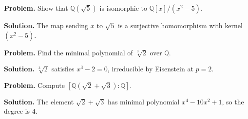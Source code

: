 \begin{example}\label{ex:sec2-8}
\textbf{Problem.} Show that $\mathbb{Q}(\sqrt{5})$ is isomorphic to $\mathbb{Q}[x]/(x^2-5)$.

\textbf{Solution.} The map sending $x$ to $\sqrt{5}$ is a surjective homomorphism with kernel $(x^2-5)$.
\end{example}

\begin{example}\label{ex:sec2-9}
\textbf{Problem.} Find the minimal polynomial of $\sqrt[3]{2}$ over $\mathbb{Q}$.

\textbf{Solution.} $\sqrt[3]{2}$ satisfies $x^3-2=0$, irreducible by Eisenstein at $p=2$.
\end{example}

\begin{example}\label{ex:sec2-10}
\textbf{Problem.} Compute $[\mathbb{Q}(\sqrt{2}+\sqrt{3}):\mathbb{Q}]$.

\textbf{Solution.} The element $\sqrt{2}+\sqrt{3}$ has minimal polynomial $x^4-10x^2+1$, so the degree is $4$.
\end{example}
